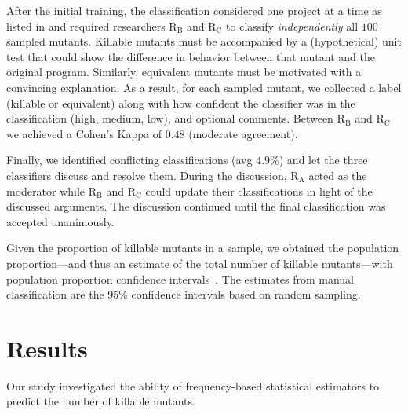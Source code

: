 \documentclass[sigconf]{acmart}
\newcommand{\rA}{\textsc{R$_\text{A}$}\xspace}
\newcommand{\rB}{\textsc{R$_\text{B}$}\xspace}
\newcommand{\rC}{\textsc{R$_\text{C}$}\xspace}
\begin{document}
After the initial training, the classification considered one project at a time %
as listed in  and required researchers \rB and \rC 
to classify \emph{independently} all $100$ sampled mutants. %
Killable mutants must be accompanied by a (hypothetical) unit test that could show the difference
in behavior between that mutant and the original program. Similarly, equivalent mutants must be
motivated with a convincing explanation. %
As a result, for each sampled mutant, we collected %
a label (killable or equivalent) along with how confident the classifier was in the classification (high, medium, low), %
and optional comments.
Between \rB and \rC we achieved a Cohen's Kappa of $0.48$ (moderate agreement).

Finally, we identified conflicting classifications (avg $4.9\%$) %
and let the three classifiers discuss and resolve them. 
During the discussion, %
\rA acted as the moderator while 
\rB and \rC could update their classifications in light of the discussed
arguments. The discussion continued until the final classification was accepted unanimously. 

Given the proportion of killable mutants in a sample, we obtained the population proportion---and thus an estimate of the total number of killable
mutants---with population proportion confidence intervals~\cite{ott2015introduction}.
The estimates from manual classification are the 95\% confidence intervals based on random sampling.

\section{Results}
\label{sec:results}
Our study %
investigated the ability of frequency-based statistical estimators to predict the
number of killable mutants. %
\end{document}
